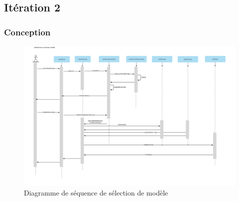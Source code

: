 \documentclass[rapport.tex]{subfiles}
\begin{document}
\subsection*{Itération 2}
\subsubsection*{Conception}
\begin{figure}[H]
    \includegraphics[width=.8\textheight, angle=270]{DSS_SelectModels.png}
\centering
    \caption{Diagramme de séquence de sélection de modèle}
\end{figure}
\end{document}
